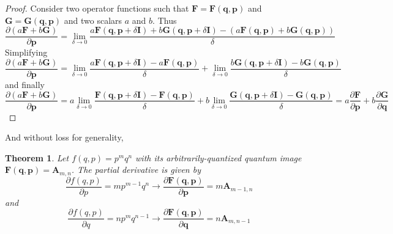 \documentclass[a4paper]{article}
\newtheorem{theorem}{Theorem}[section]
\theoremstyle{definition}
\begin{document}
\begin{proof}
	Consider two operator functions such that $\textbf{F}=\textbf{F}(\textbf{q},\textbf{p})$ and $\textbf{G}=\textbf{G}(\textbf{q},\textbf{p})$ and two scalars $a$ and $b$. Thus
	\begin{equation}
		\frac{\partial(a\textbf{F}+b\textbf{G})}{\partial \textbf{p}}=\lim_{\delta\to0}\frac{a\textbf{F}(\textbf{q},\textbf{p}+\delta\textbf{I})+b\textbf{G}(\textbf{q},\textbf{p}+\delta\textbf{I})-(a\textbf{F}(\textbf{q},\textbf{p})+b\textbf{G}(\textbf{q},\textbf{p}))}{\delta}
	\end{equation}
	Simplifying
	\begin{equation}
		\frac{\partial(a\textbf{F}+b\textbf{G})}{\partial \textbf{p}}=\lim_{\delta\to0}\frac{a\textbf{F}(\textbf{q},\textbf{p}+\delta\textbf{I})-a\textbf{F}(\textbf{q},\textbf{p})}{\delta}+\lim_{\delta\to0}\frac{b\textbf{G}(\textbf{q},\textbf{p}+\delta\textbf{I})-b\textbf{G}(\textbf{q},\textbf{p})}{\delta}
	\end{equation}
	and finally
	\begin{equation}
		\frac{\partial(a\textbf{F}+b\textbf{G})}{\partial \textbf{p}}=a\lim_{\delta\to0}\frac{\textbf{F}(\textbf{q},\textbf{p}+\delta\textbf{I})-\textbf{F}(\textbf{q},\textbf{p})}{\delta}+b\lim_{\delta\to0}\frac{\textbf{G}(\textbf{q},\textbf{p}+\delta\textbf{I})-\textbf{G}(\textbf{q},\textbf{p})}{\delta}=a\frac{\partial\textbf{F}}{\partial\textbf{p}}+b\frac{\partial\textbf{G}}{\partial\textbf{q}}
	\end{equation}
\end{proof}
And without loss for generality,
\begin{theorem}\label{thm: dqost}
	Let $f(q,p)=p^mq^n$ with its arbitrarily-quantized quantum image $\textbf{F}(\textbf{q},\textbf{p})=\textbf{A}_{m,n}$. The partial derivative is given by
	\begin{equation}
		\frac{\partial f(q,p)}{\partial p}=mp^{m-1}q^n\longrightarrow\frac{\partial\textbf{F}(\textbf{q},\textbf{p})}{\partial\textbf{p}}=m\textbf{A}_{m-1,n}
	\end{equation}
	and
	\begin{equation}
		\frac{\partial f(q,p)}{\partial q}=np^{m}q^{n-1}\longrightarrow\frac{\partial\textbf{F}(\textbf{q},\textbf{p})}{\partial\textbf{q}}=n\textbf{A}_{m,n-1}
	\end{equation}
\end{theorem}
\end{document}
